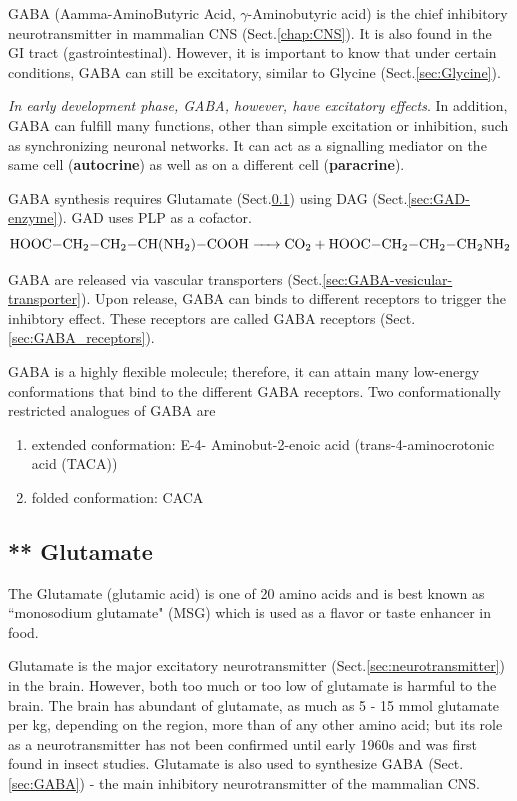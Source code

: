 GABA (Aamma-AminoButyric Acid, $\gamma$-Aminobutyric acid) is the chief
inhibitory neurotransmitter in mammalian CNS (Sect.\ref{chap:CNS}). It is also
found in the GI tract (gastrointestinal).
However, it is important to know that under certain conditions, GABA can still
be excitatory, similar to Glycine (Sect.\ref{sec:Glycine}). 

{\it In early development phase, GABA, however, have excitatory effects}.
In addition, GABA can fulfill many functions, other than simple excitation or
inhibition, such as synchronizing neuronal networks.
It can act as a signalling mediator on the same cell ({\bf autocrine}) as well
as on a different cell ({\bf paracrine}).

GABA synthesis requires Glutamate (Sect.\ref{sec:Glutamate}) using DAG
(Sect.\ref{sec:GAD-enzyme}). GAD uses PLP as a cofactor.
\begin{equation}
\ce{HOOC-CH2-CH2-CH(NH2)-COOH -> CO2 + HOOC-CH2-CH2-CH2NH2}
\end{equation}


GABA are released via vascular transporters
(Sect.\ref{sec:GABA-vesicular-transporter}). Upon release, GABA can binds to
different receptors to trigger the inhibtory effect. These receptors are called
GABA receptors (Sect.\ref{sec:GABA_receptors}).

GABA is a highly flexible molecule; therefore, it can attain many low-energy
conformations that bind to the different GABA receptors.
Two conformationally restricted analogues of GABA are
\begin{enumerate}
  \item extended conformation: E-4- Aminobut-2-enoic acid (trans-4-aminocrotonic
  acid (TACA))

  \item folded conformation: CACA
\end{enumerate}



\subsection{** Glutamate}
\label{sec:Glutamate}

The Glutamate (glutamic acid) is one of 20 amino acids and is best known as
``monosodium glutamate" (MSG) which is used as a flavor or taste enhancer in food. 

Glutamate is the major excitatory neurotransmitter
(Sect.\ref{sec:neurotransmitter}) in the brain.
However, both too much or too low of glutamate is harmful to the brain.
The brain has abundant of glutamate, as much as 5 - 15 mmol glutamate per kg,
depending on the region, more than of any other amino acid; but its role as a
neurotransmitter has not been confirmed until early 1960s and was first found in
insect studies.  Glutamate is also used to synthesize GABA (Sect.\ref{sec:GABA})
- the main inhibitory neurotransmitter of the mammalian CNS.

